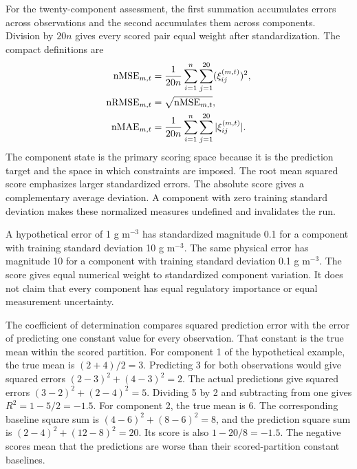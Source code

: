 For the twenty-component assessment, the first summation accumulates errors across observations and the second accumulates them across components. Division by $20n$ gives every scored pair equal weight after standardization. The compact definitions are
\begin{align}
\equationname{Normalized mean squared component error}
\mathrm{nMSE}_{m,t}&=\frac{1}{20n}\sum_{i=1}^{n}\sum_{j=1}^{20}(\xi_{ij}^{(m,t)})^2,\label{eq:projection_nmse}\\
\equationname{Normalized root mean squared component error}
\mathrm{nRMSE}_{m,t}&=\sqrt{\mathrm{nMSE}_{m,t}},\label{eq:projection_nrmse}\\
\equationname{Normalized mean absolute component error}
\mathrm{nMAE}_{m,t}&=\frac{1}{20n}\sum_{i=1}^{n}\sum_{j=1}^{20}|\xi_{ij}^{(m,t)}|.
\label{eq:projection_nmae}
\end{align}
The component state is the primary scoring space because it is the prediction target and the space in which constraints are imposed. The root mean squared score emphasizes larger standardized errors. The absolute score gives a complementary average deviation. A component with zero training standard deviation makes these normalized measures undefined and invalidates the run.

A hypothetical error of 1 g m$^{-3}$ has standardized magnitude 0.1 for a component with training standard deviation 10 g m$^{-3}$. The same physical error has magnitude 10 for a component with training standard deviation 0.1 g m$^{-3}$. The score gives equal numerical weight to standardized component variation. It does not claim that every component has equal regulatory importance or equal measurement uncertainty.

The coefficient of determination compares squared prediction error with the error of predicting one constant value for every observation. That constant is the true mean within the scored partition. For component 1 of the hypothetical example, the true mean is $(2+4)/2=3$. Predicting 3 for both observations would give squared errors $(2-3)^2+(4-3)^2=2$. The actual predictions give squared errors $(3-2)^2+(2-4)^2=5$. Dividing 5 by 2 and subtracting from one gives $R^2=1-5/2=-1.5$. For component 2, the true mean is 6. The corresponding baseline square sum is $(4-6)^2+(8-6)^2=8$, and the prediction square sum is $(2-4)^2+(12-8)^2=20$. Its score is also $1-20/8=-1.5$. The negative scores mean that the predictions are worse than their scored-partition constant baselines.

